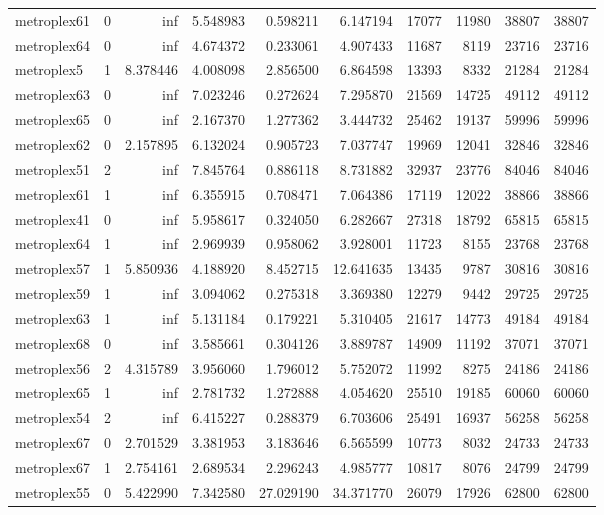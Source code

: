\begin{longtable}{|l|r|r|r|r|r|r|r|r|r|}
metroplex61 & 0 & inf & 5.548983 & 0.598211 & 6.147194 & 17077 & 11980 & 38807 & 38807 \\
metroplex64 & 0 & inf & 4.674372 & 0.233061 & 4.907433 & 11687 & 8119 & 23716 & 23716 \\
metroplex5 & 1 & 8.378446 & 4.008098 & 2.856500 & 6.864598 & 13393 & 8332 & 21284 & 21284 \\
metroplex63 & 0 & inf & 7.023246 & 0.272624 & 7.295870 & 21569 & 14725 & 49112 & 49112 \\
metroplex65 & 0 & inf & 2.167370 & 1.277362 & 3.444732 & 25462 & 19137 & 59996 & 59996 \\
metroplex62 & 0 & 2.157895 & 6.132024 & 0.905723 & 7.037747 & 19969 & 12041 & 32846 & 32846 \\
metroplex51 & 2 & inf & 7.845764 & 0.886118 & 8.731882 & 32937 & 23776 & 84046 & 84046 \\
metroplex61 & 1 & inf & 6.355915 & 0.708471 & 7.064386 & 17119 & 12022 & 38866 & 38866 \\
metroplex41 & 0 & inf & 5.958617 & 0.324050 & 6.282667 & 27318 & 18792 & 65815 & 65815 \\
metroplex64 & 1 & inf & 2.969939 & 0.958062 & 3.928001 & 11723 & 8155 & 23768 & 23768 \\
metroplex57 & 1 & 5.850936 & 4.188920 & 8.452715 & 12.641635 & 13435 & 9787 & 30816 & 30816 \\
metroplex59 & 1 & inf & 3.094062 & 0.275318 & 3.369380 & 12279 & 9442 & 29725 & 29725 \\
metroplex63 & 1 & inf & 5.131184 & 0.179221 & 5.310405 & 21617 & 14773 & 49184 & 49184 \\
metroplex68 & 0 & inf & 3.585661 & 0.304126 & 3.889787 & 14909 & 11192 & 37071 & 37071 \\
metroplex56 & 2 & 4.315789 & 3.956060 & 1.796012 & 5.752072 & 11992 & 8275 & 24186 & 24186 \\
metroplex65 & 1 & inf & 2.781732 & 1.272888 & 4.054620 & 25510 & 19185 & 60060 & 60060 \\
metroplex54 & 2 & inf & 6.415227 & 0.288379 & 6.703606 & 25491 & 16937 & 56258 & 56258 \\
metroplex67 & 0 & 2.701529 & 3.381953 & 3.183646 & 6.565599 & 10773 & 8032 & 24733 & 24733 \\
metroplex67 & 1 & 2.754161 & 2.689534 & 2.296243 & 4.985777 & 10817 & 8076 & 24799 & 24799 \\
metroplex55 & 0 & 5.422990 & 7.342580 & 27.029190 & 34.371770 & 26079 & 17926 & 62800 & 62800 \\

\end{longtable}
